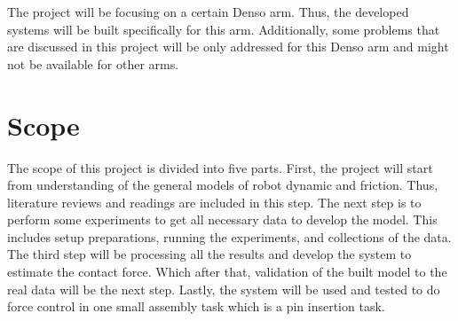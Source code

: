 The project will be focusing on a certain Denso arm. Thus, the developed systems will be built specifically for this arm. Additionally, some problems that are discussed in this project will be only addressed for this Denso arm and might not be available for other arms.


\section{Scope}


The scope of this project is divided into five parts. First, the project will start from understanding of the general models of robot dynamic and friction. Thus, literature reviews and readings are included in this step. The next step is to perform some experiments to get all necessary data to develop the model. This includes setup preparations, running the experiments, and collections of the data. The third step will be processing all the results and develop the system to estimate the contact force. Which after that, validation of the built model to the real data will be the next step. Lastly, the system will be used and tested to do force control in one small assembly task which is a pin insertion task.
